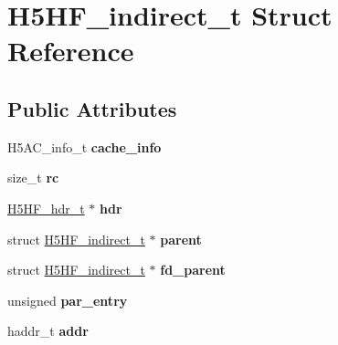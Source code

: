 \hypertarget{struct_h5_h_f__indirect__t}{}\section{H5\+H\+F\+\_\+indirect\+\_\+t Struct Reference}
\label{struct_h5_h_f__indirect__t}
\subsection*{Public Attributes}
\begin{DoxyCompactItemize}
\item 
\mbox{\label{struct_h5_h_f__indirect__t_afa18d49a5d222b0e0bacd723fa7be00d}} 
H5\+A\+C\+\_\+info\+\_\+t {\bfseries cache\+\_\+info}
\item 
\mbox{\label{struct_h5_h_f__indirect__t_abced3d3e838ae5fcc066b36ac13a0cd2}} 
size\+\_\+t {\bfseries rc}
\item 
\mbox{\label{struct_h5_h_f__indirect__t_a11653825059f57be2327275c01a2c3ba}} 
\hyperlink{struct_h5_h_f__hdr__t}{H5\+H\+F\+\_\+hdr\+\_\+t} $\ast$ {\bfseries hdr}
\item 
\mbox{\label{struct_h5_h_f__indirect__t_a2fe06b161c313be0e69e73eb12e273fb}} 
struct \hyperlink{struct_h5_h_f__indirect__t}{H5\+H\+F\+\_\+indirect\+\_\+t} $\ast$ {\bfseries parent}
\item 
\mbox{\label{struct_h5_h_f__indirect__t_aabd7fed2260002ed5c8f9d64d7020c08}} 
struct \hyperlink{struct_h5_h_f__indirect__t}{H5\+H\+F\+\_\+indirect\+\_\+t} $\ast$ {\bfseries fd\+\_\+parent}
\item 
\mbox{\label{struct_h5_h_f__indirect__t_a77ed1f2f38024e89fea9ea404bf7cd63}} 
unsigned {\bfseries par\+\_\+entry}
\item 
\mbox{\label{struct_h5_h_f__indirect__t_aa26ea3266c4b9483c6b288e27f1a9563}} 
haddr\+\_\+t {\bfseries addr}
\item 
\mbox{\label{struct_h5_h_f__indirect__t_ac39a6c15530894be5d9d2b9a1a7ec134}} 

\end{DoxyCompactItemize}
